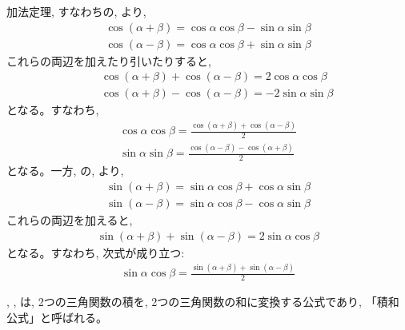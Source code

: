 加法定理, すなわちの, より, 
\begin{eqnarray*}
\cos(\alpha + \beta)=\cos\alpha \cos\beta - \sin\alpha \sin\beta\\
\cos(\alpha - \beta)=\cos\alpha \cos\beta + \sin\alpha \sin\beta
\end{eqnarray*}
これらの両辺を加えたり引いたりすると, 
\begin{eqnarray}
&&\cos(\alpha + \beta)+\cos(\alpha - \beta)=2\cos\alpha \cos\beta\label{eq:waseki1}\\
&&\cos(\alpha + \beta)-\cos(\alpha - \beta)=-2\sin\alpha \sin\beta\label{eq:waseki2}
\end{eqnarray}
となる。すなわち, 
\begin{eqnarray}
\cos\alpha \cos\beta=\frac{\cos(\alpha + \beta)+\cos(\alpha - \beta)}{2}\label{eq:sekiwa1}\\
\sin\alpha \sin\beta=\frac{\cos(\alpha - \beta)-\cos(\alpha + \beta)}{2}\label{eq:sekiwa2}
\end{eqnarray}
となる。一方, の, より, 
\begin{eqnarray*}
\sin(\alpha + \beta)=\sin\alpha \cos\beta + \cos\alpha \sin\beta\\
\sin(\alpha - \beta)=\sin\alpha \cos\beta - \cos\alpha \sin\beta
\end{eqnarray*}
これらの両辺を加えると,
\begin{eqnarray}
\sin(\alpha + \beta)+\sin(\alpha - \beta)=2\sin\alpha \cos\beta\label{eq:waseki3}
\end{eqnarray}
となる。すなわち, 次式が成り立つ:
\begin{eqnarray}
\sin\alpha \cos\beta=\frac{\sin(\alpha + \beta)+\sin(\alpha - \beta)}{2}\label{eq:sekiwa3}
\end{eqnarray}

, , は, 2つの三角関数の積を, 
2つの三角関数の和に変換する公式であり, 「積和公式」と呼ばれる。

